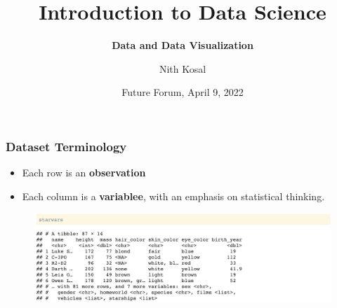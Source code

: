 \documentclass[11pt]{beamer}
\begin{document}
	\author[Nith Kosal]{Nith Kosal}
	\title[Presentation Title]{\textbf{Introduction to Data Science}}
	\subtitle{\textbf{Data and Data Visualization}}
	\date[\today]{Future Forum, April 9, 2022}
	\begin{frame}[plain]
		\maketitle
	\end{frame}
	

	
	\begin{frame}

		\frametitle{\textbf{Dataset Terminology}}
			
		
		\begin{itemize}
			\item Each row is an \textbf{observation}
			\item Each column is a \textbf{variablee}, with an emphasis on statistical thinking.
		\end{itemize}
	
	\begin{figure}
		\centering
		\includegraphics[width=1\linewidth]{Images/S2/code/s1}

	\end{figure}
	
	\end{frame}
	
\end{document}
